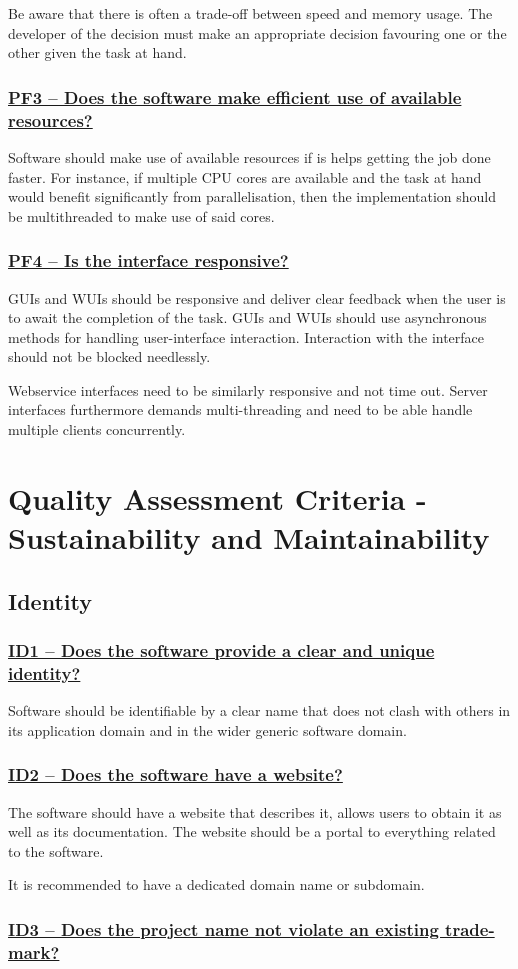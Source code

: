 \documentclass[a4paper,11pt]{article}
\newcommand{\indicator}[1]{\subsubsection*{\underline{#1}}}
\begin{document}
Be aware that there is often a trade-off between speed and memory usage. The
developer of the decision must make an appropriate decision favouring one or the other
given the task at hand. 

\indicator{PF3 -- Does the software make efficient use of available resources?}

Software should make use of available resources if is helps getting the job
done faster. For instance, if multiple CPU cores are available and the task at hand
would benefit significantly from parallelisation, then the implementation should be
multithreaded to make use of said cores.

\indicator{PF4 -- Is the interface responsive?}

GUIs and WUIs should be responsive and deliver clear feedback when the user is
to await the completion of the task. GUIs and WUIs should use asynchronous methods for
handling user-interface interaction. Interaction with the interface should not
be blocked needlessly.

Webservice interfaces need to be similarly responsive and not time out. Server
interfaces furthermore demands multi-threading and need to be able handle
multiple clients concurrently.


\section{Quality Assessment Criteria - Sustainability and Maintainability}

\subsection{Identity}

\indicator{ID1 -- Does the software provide a clear and unique identity?}

Software should be identifiable by a clear name that does not clash with others
in its application domain and in the wider generic software domain. 

\indicator{ID2 -- Does the software have a website?}

The software should have a website that describes it, allows users to obtain
it as well as its documentation. The website should be a portal to everything
related to the software.

It is recommended to have a dedicated domain name or subdomain.

\indicator{ID3 -- Does the project name not violate an existing trade-mark?}
\end{document}
